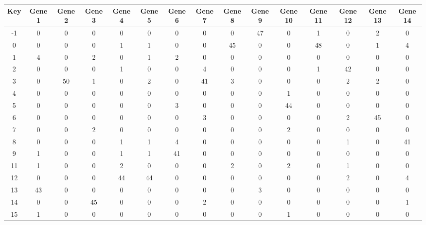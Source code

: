 \begin{tabular}{|c|c|c|c|c|c|c|c|c|c|c|c|c|c|c|}
\hline
Key & Gene 1 & Gene 2 & Gene 3 & Gene 4 & Gene 5 & Gene 6 & Gene 7 & Gene 8 & Gene 9 & Gene 10 & Gene 11 & Gene 12 & Gene 13 & Gene 14 \\
\hline
-1 & 0 & 0 & 0 & 0 & 0 & 0 & 0 & 0 & 47 & 0 & 1 & 0 & 2 & 0 \\
0 & 0 & 0 & 0 & 1 & 1 & 0 & 0 & 45 & 0 & 0 & 48 & 0 & 1 & 4 \\
1 & 4 & 0 & 2 & 0 & 1 & 2 & 0 & 0 & 0 & 0 & 0 & 0 & 0 & 0 \\
2 & 0 & 0 & 0 & 1 & 0 & 0 & 4 & 0 & 0 & 0 & 1 & 42 & 0 & 0 \\
3 & 0 & 50 & 1 & 0 & 2 & 0 & 41 & 3 & 0 & 0 & 0 & 2 & 2 & 0 \\
4 & 0 & 0 & 0 & 0 & 0 & 0 & 0 & 0 & 0 & 1 & 0 & 0 & 0 & 0 \\
5 & 0 & 0 & 0 & 0 & 0 & 3 & 0 & 0 & 0 & 44 & 0 & 0 & 0 & 0 \\
6 & 0 & 0 & 0 & 0 & 0 & 0 & 3 & 0 & 0 & 0 & 0 & 2 & 45 & 0 \\
7 & 0 & 0 & 2 & 0 & 0 & 0 & 0 & 0 & 0 & 2 & 0 & 0 & 0 & 0 \\
8 & 0 & 0 & 0 & 1 & 1 & 4 & 0 & 0 & 0 & 0 & 0 & 1 & 0 & 41 \\
9 & 1 & 0 & 0 & 1 & 1 & 41 & 0 & 0 & 0 & 0 & 0 & 0 & 0 & 0 \\
11 & 1 & 0 & 0 & 2 & 0 & 0 & 0 & 2 & 0 & 2 & 0 & 1 & 0 & 0 \\
12 & 0 & 0 & 0 & 44 & 44 & 0 & 0 & 0 & 0 & 0 & 0 & 2 & 0 & 4 \\
13 & 43 & 0 & 0 & 0 & 0 & 0 & 0 & 0 & 3 & 0 & 0 & 0 & 0 & 0 \\
14 & 0 & 0 & 45 & 0 & 0 & 0 & 2 & 0 & 0 & 0 & 0 & 0 & 0 & 1 \\
15 & 1 & 0 & 0 & 0 & 0 & 0 & 0 & 0 & 0 & 1 & 0 & 0 & 0 & 0 \\
\hline
\end{tabular}
